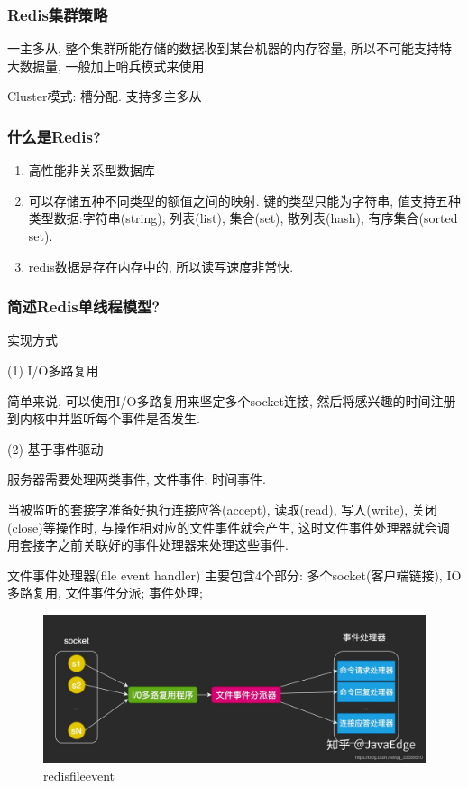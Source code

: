 \documentclass[UTF8]{ctexart}
\begin{document}
\subsubsection{Redis集群策略}
一主多从, 整个集群所能存储的数据收到某台机器的内存容量, 所以不可能支持特大数据量, 一般加上哨兵模式来使用 \par
Cluster模式: 槽分配. 支持多主多从

\subsubsection{什么是Redis?}
\begin{enumerate}
	\item 高性能非关系型数据库
	\item 可以存储五种不同类型的额值之间的映射. 键的类型只能为字符串, 值支持五种类型数据:字符串(string), 列表(list), 集合(set), 散列表(hash), 有序集合(sorted set).
	\item redis数据是存在内存中的, 所以读写速度非常快.
\end{enumerate}
\subsubsection{简述Redis单线程模型?}
实现方式
\par
(1) I/O多路复用
\par
简单来说, 可以使用I/O多路复用来坚定多个socket连接, 然后将感兴趣的时间注册到内核中并监听每个事件是否发生. 
\par
(2) 基于事件驱动
\par
服务器需要处理两类事件, 文件事件; 时间事件.
\par
当被监听的套接字准备好执行连接应答(accept), 读取(read), 写入(write), 关闭(close)等操作时, 与操作相对应的文件事件就会产生, 这时文件事件处理器就会调用套接字之前关联好的事件处理器来处理这些事件.
\par
文件事件处理器(file event handler) 主要包含4个部分: 多个socket(客户端链接), IO多路复用, 文件事件分派; 事件处理;
\begin{figure}
	\centering
	\includegraphics[width=0.7\linewidth]{figures/redis_file_event.jpg}
	\caption{redisfileevent}
	\label{fig:redis_file_event}
\end{figure}
\end{document}
